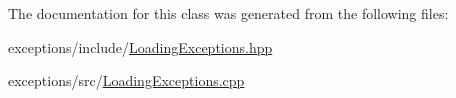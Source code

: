 The documentation for this class was generated from the following files\-:\begin{DoxyCompactItemize}
\item 
exceptions/include/\hyperlink{_loading_exceptions_8hpp}{Loading\-Exceptions.\-hpp}\item 
exceptions/src/\hyperlink{_loading_exceptions_8cpp}{Loading\-Exceptions.\-cpp}\end{DoxyCompactItemize}
